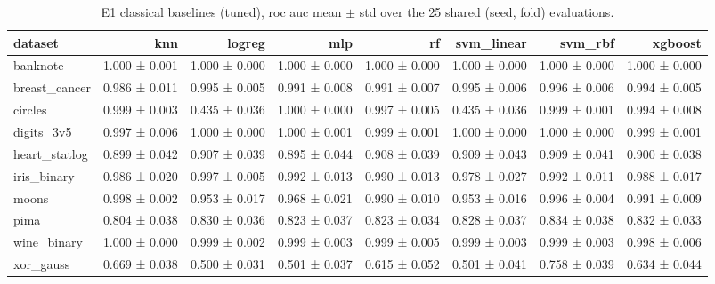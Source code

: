 \begin{table}[ht]
\centering
\caption{E1 classical baselines (tuned), roc auc mean $\pm$ std over the 25 shared (seed, fold) evaluations.}
\label{tab:e1-tuned-roc_auc}
\begin{tabular}{lrrrrrrr}
\toprule
dataset & knn & logreg & mlp & rf & svm\_linear & svm\_rbf & xgboost \\
\midrule
banknote & 1.000 ± 0.001 & 1.000 ± 0.000 & 1.000 ± 0.000 & 1.000 ± 0.000 & 1.000 ± 0.000 & 1.000 ± 0.000 & 1.000 ± 0.000 \\
breast\_cancer & 0.986 ± 0.011 & 0.995 ± 0.005 & 0.991 ± 0.008 & 0.991 ± 0.007 & 0.995 ± 0.006 & 0.996 ± 0.006 & 0.994 ± 0.005 \\
circles & 0.999 ± 0.003 & 0.435 ± 0.036 & 1.000 ± 0.000 & 0.997 ± 0.005 & 0.435 ± 0.036 & 0.999 ± 0.001 & 0.994 ± 0.008 \\
digits\_3v5 & 0.997 ± 0.006 & 1.000 ± 0.000 & 1.000 ± 0.001 & 0.999 ± 0.001 & 1.000 ± 0.000 & 1.000 ± 0.000 & 0.999 ± 0.001 \\
heart\_statlog & 0.899 ± 0.042 & 0.907 ± 0.039 & 0.895 ± 0.044 & 0.908 ± 0.039 & 0.909 ± 0.043 & 0.909 ± 0.041 & 0.900 ± 0.038 \\
iris\_binary & 0.986 ± 0.020 & 0.997 ± 0.005 & 0.992 ± 0.013 & 0.990 ± 0.013 & 0.978 ± 0.027 & 0.992 ± 0.011 & 0.988 ± 0.017 \\
moons & 0.998 ± 0.002 & 0.953 ± 0.017 & 0.968 ± 0.021 & 0.990 ± 0.010 & 0.953 ± 0.016 & 0.996 ± 0.004 & 0.991 ± 0.009 \\
pima & 0.804 ± 0.038 & 0.830 ± 0.036 & 0.823 ± 0.037 & 0.823 ± 0.034 & 0.828 ± 0.037 & 0.834 ± 0.038 & 0.832 ± 0.033 \\
wine\_binary & 1.000 ± 0.000 & 0.999 ± 0.002 & 0.999 ± 0.003 & 0.999 ± 0.005 & 0.999 ± 0.003 & 0.999 ± 0.003 & 0.998 ± 0.006 \\
xor\_gauss & 0.669 ± 0.038 & 0.500 ± 0.031 & 0.501 ± 0.037 & 0.615 ± 0.052 & 0.501 ± 0.041 & 0.758 ± 0.039 & 0.634 ± 0.044 \\
\bottomrule
\end{tabular}
\end{table}
